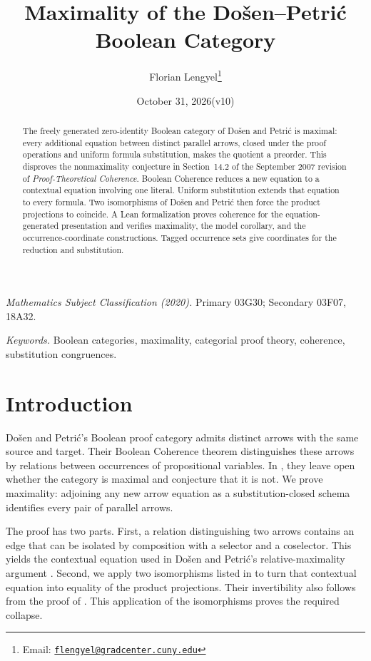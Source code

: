 \documentclass[11pt]{article}
\title{Maximality of the Do\v{s}en--Petri\'c Boolean Category}
\author{Florian Lengyel\thanks{Email: \href{mailto:flengyel@gradcenter.cuny.edu}{\texttt{flengyel@gradcenter.cuny.edu}}}}
\date{October 31, 2026\quad(v10)}
\begin{document}
\maketitle

\begin{abstract}
The freely generated zero-identity Boolean category of Do\v{s}en and
Petri\'c is maximal: every additional equation between distinct parallel
arrows, closed under the proof operations and uniform formula
substitution, makes the quotient a preorder. This disproves the
nonmaximality conjecture in Section~14.2 of the September 2007 revision
of \emph{Proof-Theoretical Coherence}. Boolean Coherence reduces a new
equation to a contextual equation involving one literal. Uniform
substitution extends that equation to every formula. Two
isomorphisms of Do\v{s}en and Petri\'c then force the product projections
to coincide. A Lean formalization proves coherence for the equation-generated
presentation and verifies maximality, the model corollary, and the
occurrence-coordinate constructions. Tagged occurrence
sets give coordinates for the reduction and substitution.
\end{abstract}

\medskip
\noindent\textit{Mathematics Subject Classification (2020).}
Primary 03G30; Secondary 03F07, 18A32.

\smallskip
\noindent\textit{Keywords.} Boolean categories, maximality, categorial proof theory,
coherence, substitution congruences.

\section{Introduction}

Do\v{s}en and Petri\'c's Boolean proof category admits distinct arrows
with the same source and target. Their Boolean Coherence theorem
distinguishes these arrows by relations between occurrences of
propositional variables. In \cite[\S14.2, p.~322]{DP}, they leave open
whether the category is maximal and conjecture that it is not. We prove
maximality: adjoining any new arrow equation as a substitution-closed
schema identifies every pair of parallel arrows.

The proof has two parts. First, a relation distinguishing two arrows
contains an edge that can be isolated by composition with a selector
and a coselector. This yields the contextual equation used in
Do\v{s}en and Petri\'c's relative-maximality argument
\cite[\S9.7, pp.~215--216]{DP}. Second, we apply two isomorphisms listed in
\cite[\S12.5, p.~294]{DP} to turn that contextual equation into equality
of the product projections. Their invertibility also follows from the
proof of \cite[Lemma~7]{DPIsomorphic}. This application of the
isomorphisms proves the required collapse.
\end{document}
